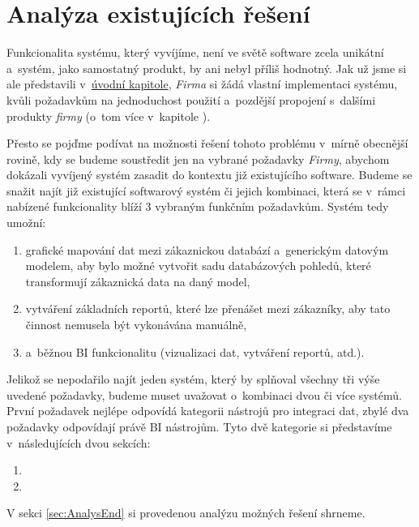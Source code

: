 \chapter{Analýza existujících řešení}\label{chap:analysis}

Funkcionalita systému, který vyvíjíme, není ve světě software zcela unikátní a~systém, jako samostatný produkt, by ani nebyl příliš hodnotný.
Jak už jsme si ale představili v~\hyperref[chap:intro]{úvodní kapitole}, \textit{Firma} si žádá vlastní implementaci systému, kvůli požadavkům na jednoduchost použití a~pozdější propojení s~dalšími produkty \textit{firmy} (o~tom více v~kapitole ).

Přesto se pojďme podívat na možnosti řešení tohoto problému v~mírně obecnější rovině, kdy se budeme soustředit jen na vybrané požadavky \textit{Firmy}, abychom dokázali vyvíjený systém zasadit do kontextu již existujícího software.
Budeme se snažit najít již existující softwarový systém či jejich kombinaci, která se v~rámci nabízené funkcionality blíží 3 vybraným funkčním požadavkům. Systém tedy umožní:

\begin{enumerate}
    \item grafické mapování dat mezi zákaznickou databází a~generickým datovým modelem, aby bylo možné vytvořit sadu databázových pohledů, které transformují zákaznická data na daný model,
    \item vytváření základních reportů, které lze přenášet mezi zákazníky, aby tato činnost nemusela být vykonávána manuálně,
    \item a~běžnou BI funkcionalitu (vizualizaci dat, vytváření reportů, atd.).
\end{enumerate}

Jelikož se nepodařilo najít jeden systém, který by splňoval všechny tři výše uvedené požadavky, budeme muset uvažovat o~kombinaci dvou či více systémů.
První požadavek nejlépe odpovídá kategorii nástrojů pro integraci dat, zbylé dva požadavky odpovídají právě BI nástrojům.
Tyto dvě kategorie si představíme v~následujících dvou sekcích:

\begin{enumerate}
    \item {}
    \item {}
\end{enumerate}

V sekci \ref{sec:AnalysEnd} si provedenou analýzu možných řešení shrneme.

